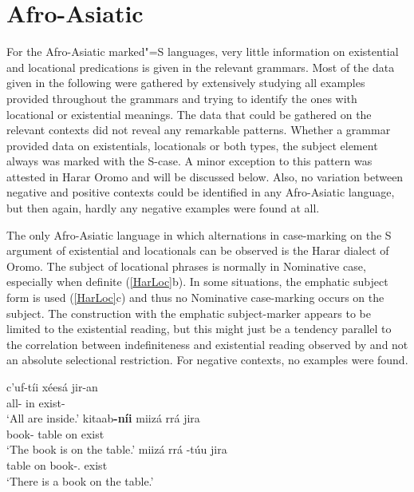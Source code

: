 \section{Afro-Asiatic}\label{ExistAfro}

For the Afro-Asiatic marked"=S languages, very little information on existential and locational predications is given in the relevant grammars. 
Most of the data given in the following were gathered by extensively studying all examples provided throughout the grammars and trying to identify the ones with locational or existential meanings.
The data that could be gathered on the relevant contexts did not reveal any remarkable patterns. 
Whether a grammar provided data on existentials, locationals or both types, the subject element always was marked with the S-case. 
A minor exception to this pattern was attested in Harar Oromo and will be discussed below.
Also, no variation between negative and positive contexts could be identified in any Afro-Asiatic language, but then again, hardly any negative examples were found at all.

The only Afro-Asiatic language in which alternations in case-marking on the S argument of existential and locationals can be observed is the Harar dialect of Oromo. 
The subject of locational phrases is normally in Nominative case, especially when definite (\ref{HarLoc}b). 
In some situations, the emphatic subject form is used (\ref{HarLoc}c) and thus no Nominative case-marking occurs on the subject. 
The construction with the emphatic subject-marker appears to be limited to the existential reading, but this might just be a tendency parallel to the correlation between indefiniteness and existential reading observed by \citet{Clark:1978} and not an absolute selectional restriction. 
For negative contexts, no examples were found.

\begin{exe}
\ex\label{HarLoc} 
\begin{xlist}
\ex\gll c'uf-t\'ii x\'ees\'a jir-an\\
all-\nom{} in exist-\pl{}\\
\glt `All are inside.'
\ex \gll kitaab\textbf{-n\'ii} miiz\'a rr\'a jira\\
book-\nom{} table on exist\\
\glt `The book is on the table.'
\ex \gll miiz\'a rr\'a -t\'uu jira\\
table on book-\emphat.\sbj{} exist\\
\glt `There is a book on the table.' 
\end{xlist}
\end{exe}

